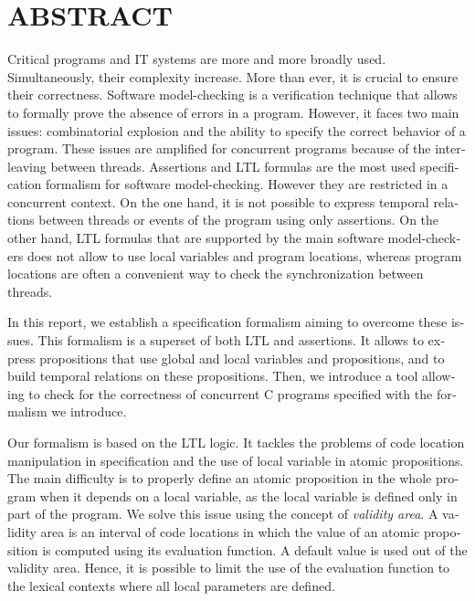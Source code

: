%

\chapter*{ABSTRACT}\thispagestyle{headings}
%
\begin{otherlanguage}{english}

Critical programs and IT systems are more and more broadly used. Simultaneously,
their complexity increase. More than ever, it is crucial to ensure their
correctness. Software model-checking is a verification technique that allows to
formally prove the absence of errors in a program. However, it faces two main
issues: combinatorial explosion and the ability to specify the correct behavior
of a program. These issues are amplified for concurrent programs because of the
interleaving between threads. Assertions and LTL formulas are the most used
specification formalism for software model-checking. However they are
restricted in a concurrent context. On the one hand, it is not possible to
express temporal relations between threads or events of the program using only
assertions. On the other hand, LTL formulas that are supported by the main
software model-checkers does not allow to use local variables and program
locations, whereas program locations are often a convenient way to check the
synchronization between threads.

In this report, we establish a specification formalism aiming to overcome these
issues. This formalism is a superset of both LTL and assertions. It allows to
express propositions that use global and local variables and propositions, and to
build temporal relations on these propositions. Then, we introduce a tool
allowing to check for the correctness of concurrent C programs specified with
the formalism we introduce.

Our formalism is based on the LTL logic. It tackles the problems of code location
manipulation in specification and the use of local variable
in atomic propositions. The main difficulty is to properly define an atomic
proposition in the whole program when it depends on a local variable, as the
local variable is defined only in part of the program. We solve this issue using
the concept of \emph{validity area}. A validity area is an interval of code
locations in which the value of an atomic proposition is computed using its
evaluation function. A default value is used out of the validity area. Hence, it
is possible to limit the use of the evaluation function to the lexical contexts
where all local parameters are defined.


\end{otherlanguage}
